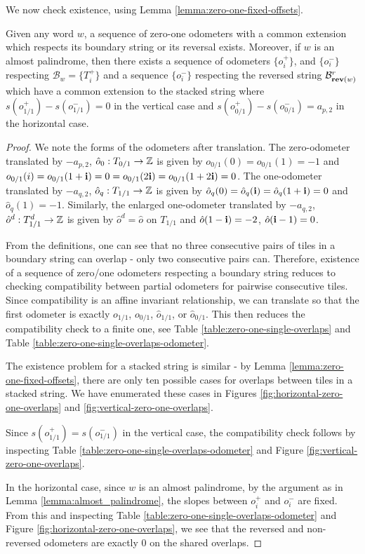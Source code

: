 \documentclass[12pt]{amsart}
\begin{document}
We now check existence, using Lemma \ref{lemma:zero-one-fixed-offsets}. 
\begin{lemma} \label{lemma:stacked_zero_one_string}
	Given any word $w$, a sequence of zero-one odometers with a common extension which respects its boundary string or its reversal exists. 
	Moreover, if $w$ is an almost palindrome, then there exists a sequence of odometers $\{o_i^+\}$, and $\{o_i^-\}$
	respecting $\mathcal{B}_w = \{T_i^+\}$ and a sequence $\{o_i^-\}$ respecting the reversed string 
	$\mathcal{B}^r_{\mathop{\bf rev}(w)}$ which have a common extension to the stacked string  where $s(o_{1/1}^+) - s(o_{1/1}^-) = 0$ in the vertical case and $s(o_{0/1}^+) - s(o_{0/1}^-) = a_{p,2}$ in the horizontal case.
\end{lemma}

\begin{proof}
	We note the forms of the odometers after translation.  The zero-odometer translated by $-a_{p,2}$,  $\hat{o}_0: T_{0/1} \to \mathbb{Z}$ is given by $o_{0/1}(0)=o_{0/1}(1) = -1$ and $o_{0/1}(i) = o_{0/1}(1+ \mathbf{i}) = 0 = o_{0/1}(2 \mathbf{i}) = o_{0/1}(1 + 2\mathbf{i}) = 0$.  The one-odometer translated by $-a_{q,2}$,  $\hat{o}_q:T_{1/1} \to \mathbb{Z}$ is given by 
	$\hat{o}_q(0)=\hat{o}_q(\mathbf{i}) = \hat{o}_q(1+ \mathbf{i})=0$ and $\hat{o}_q(1) = -1$. Similarly, the enlarged one-odometer translated
	by $-a_{q,2}$, $\hat{o}^d:T_{1/1}^d \to \mathbb{Z}$ is given by $\hat{o}^d = \hat{o}$ on $T_{1/1}$ and $\hat{o}(1-\mathbf{i})=-2$, $\hat{o}(\mathbf{i}-1)=0$. 
	
	
	From the definitions, one can see that no three consecutive pairs of tiles in a boundary string can overlap - 
	only two consecutive pairs can. Therefore, existence of a sequence of zero/one odometers respecting a boundary string reduces to checking 
	compatibility between partial odometers for pairwise consecutive tiles. Since compatibility is an affine invariant relationship, 
	we can translate so that the first odometer is exactly $o_{1/1}$, $o_{0/1}$, $\hat{o}_{1/1}$, or $\hat{o}_{0/1}$. This then reduces the compatibility check to a finite one, 
	see Table \ref{table:zero-one-single-overlaps} and Table \ref{table:zero-one-single-overlaps-odometer}. 
	
	The existence problem for a stacked string is similar - by Lemma \ref{lemma:zero-one-fixed-offsets}, there 
	are only ten possible cases for overlaps between tiles in a stacked string. We have enumerated these cases in 
	Figures \ref{fig:horizontal-zero-one-overlaps} and \ref{fig:vertical-zero-one-overlaps}.
	
	Since $s(o_{1/1}^+) = s(o_{1/1}^-)$ in the vertical case, the compatibility check follows by inspecting Table \ref{table:zero-one-single-overlaps-odometer} and Figure \ref{fig:vertical-zero-one-overlaps}.

	In the horizontal case, since $w$ is an almost palindrome, by the
	argument as in Lemma \ref{lemma:almost_palindrome}, the slopes between $o_i^+$ and $o_i^-$ are fixed.
	From this and inspecting Table \ref{table:zero-one-single-overlaps-odometer} and Figure \ref{fig:horizontal-zero-one-overlaps}, we see that the reversed and non-reversed odometers are exactly 0 on the shared overlaps. 
\end{proof}
\end{document}
